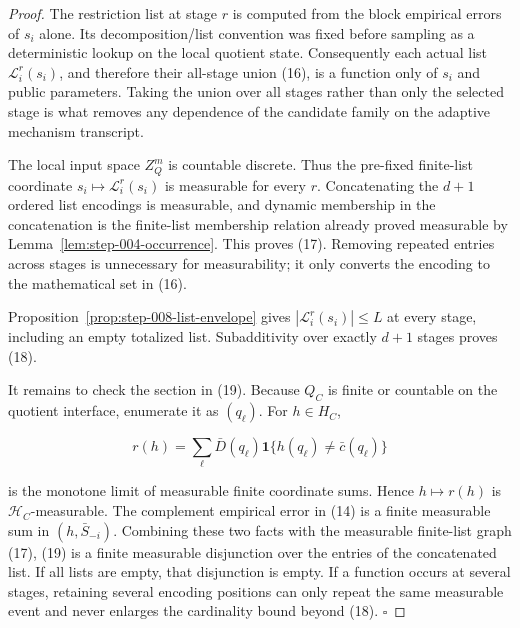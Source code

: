 \begin{proof}
The restriction list at stage \(r\) is computed from the
block empirical errors of \(s_i\) alone. Its decomposition/list convention
was fixed before sampling as a deterministic lookup on the local quotient
state. Consequently each actual list \(\mathcal L_i^r(s_i)\), and therefore
their all-stage union (16), is a function only of \(s_i\) and public
parameters. Taking the union over all stages rather than only the selected
stage is what removes any dependence of the candidate family on the
adaptive mechanism transcript.

The local input space \(Z_Q^m\) is countable discrete. Thus the pre-fixed
finite-list coordinate \(s_i\mapsto\mathcal L_i^r(s_i)\) is measurable for
every \(r\). Concatenating the \(d+1\) ordered list encodings is measurable,
and dynamic membership in the concatenation is the finite-list membership
relation already proved measurable by Lemma~\ref{lem:step-004-occurrence}.
This proves (17). Removing repeated entries across stages is unnecessary
for measurability; it only converts the encoding to the mathematical set in
(16).

Proposition~\ref{prop:step-008-list-envelope} gives
\(|\mathcal L_i^r(s_i)|\leq L\) at every stage, including an empty
totalized list. Subadditivity over exactly \(d+1\) stages proves (18).

It remains to check the section in (19). Because \(Q_C\) is finite or
countable on the  quotient interface, enumerate it as
\((q_\ell)\). For \(h\in H_C\),

\[
 r(h)=\sum_{\ell}\bar D(q_\ell)
       \mathbf1\{h(q_\ell)\ne\bar c(q_\ell)\}
 \tag{20}
\]

is the monotone limit of measurable finite coordinate sums. Hence
\(h\mapsto r(h)\) is \(\mathcal H_C\)-measurable. The complement empirical
error in (14) is a finite measurable sum in \((h,\bar S_{-i})\). Combining
these two facts with the measurable finite-list graph (17), (19) is a
finite measurable disjunction over the entries of the concatenated list.
If all lists are empty, that disjunction is empty. If a function occurs at
several stages, retaining several encoding positions can only repeat the
same measurable event and never enlarges the cardinality bound beyond
(18). \(\square\)


\end{proof}

